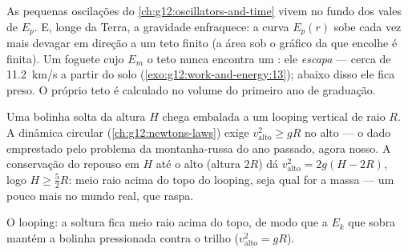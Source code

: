 \begin{remark}\label{rem:g12:work-and-energy:escape}
As pequenas oscilações do \cref{ch:g12:oscillators-and-time} vivem no fundo dos vales
de $E_p$. E, longe da Terra, a gravidade enfraquece: a curva $E_p(r)$ sobe cada vez
mais devagar em direção a um teto finito (a área sob o gráfico da  que encolhe é
finita). Um foguete cujo $E_m$  o teto nunca encontra um : ele
\emph{escapa} --- cerca de \qty{11.2}{km/s} a partir do
solo (\cref{exo:g12:work-and-energy:13}); abaixo disso ele fica preso. O próprio teto é
calculado no volume do primeiro ano de graduação.
\end{remark}

\begin{example}[O looping]\label{ex:g12:work-and-energy:loop}
Uma bolinha solta da altura $H$ chega embalada a um looping vertical de raio $R$. A
dinâmica circular (\cref{ch:g12:newtons-laws}) exige $v_{\text{alto}}^2 \geq gR$ no
alto --- o dado emprestado pelo problema da montanha-russa do ano passado, agora nosso.
A conservação do repouso em $H$ até o alto (altura $2R$) dá
$v_{\text{alto}}^2 = 2g(H - 2R)$, logo $H \geq \tfrac52 R$: meio raio acima do topo do
looping, seja qual for a massa --- um pouco mais no mundo real, que raspa.
\end{example}

\begin{omfigure}

{\small O looping: a soltura fica meio raio acima do topo, de modo que a $E_k$ que
sobra mantém a bolinha pressionada contra o trilho
($v_{\text{alto}}^2 = gR$).}
\end{omfigure}

